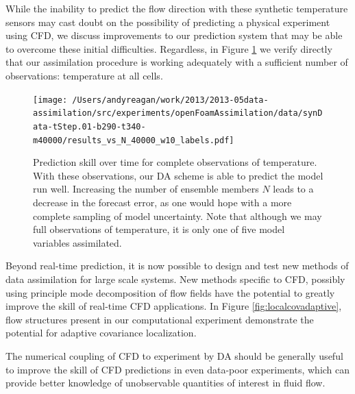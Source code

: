 While the inability to predict the flow direction with these synthetic temperature sensors may cast doubt on the possibility of predicting a physical experiment using CFD, we discuss improvements to our prediction system that may be able to overcome these initial difficulties.
Regardless, in Figure \ref{fig:fullObsExp} we verify directly that our assimilation procedure is working adequately with a sufficient number of observations: temperature at all cells.

\begin{figure}[h!]
  \centering
  \texttt{[image: /Users/andyreagan/work/2013/2013-05data-assimilation/src/experiments/openFoamAssimilation/data/synData-tStep.01-b290-t340-m40000/results\_vs\_N\_40000\_w10\_labels.pdf]}
  \caption[Prediction skill over time for complete observations of temperature]{
    Prediction skill over time for complete observations of temperature.
    With these observations, our DA scheme is able to predict the model run well.
    Increasing the number of ensemble members $N$ leads to a decrease in the forecast error, as one would hope with a more complete sampling of model uncertainty.
    Note that although we may full observations of temperature, it is only one of five model variables assimilated.
  }
  \label{fig:fullObsExp}
\end{figure}

Beyond real-time prediction, it is now possible to design and test new methods of data assimilation for large scale systems.
New methods specific to CFD, possibly using principle mode decomposition of flow fields have the potential to greatly improve the skill of real-time CFD applications.
In Figure \ref{fig:localcovadaptive}, flow structures present in our computational experiment demonstrate the potential for adaptive covariance localization.

The numerical coupling of CFD to experiment by DA should be generally useful to improve the skill of CFD predictions in even data-poor experiments, which can provide better knowledge of unobservable quantities of interest in fluid flow.
